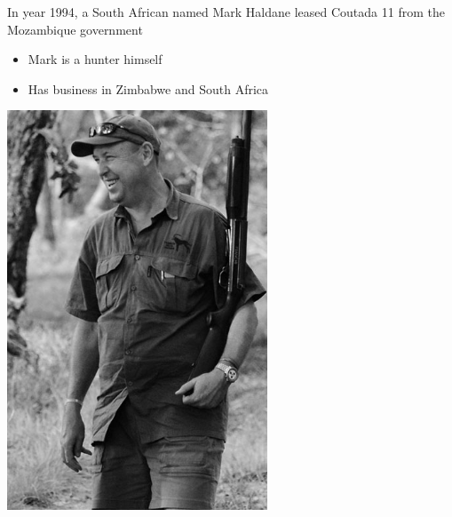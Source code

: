 \begin{frame}{}
\protect\hypertarget{section-29}{}

In year 1994, a South African named Mark Haldane leased Coutada 11 from
the Mozambique government

\begin{itemize}
\tightlist
\item
  Mark is a hunter himself
\item
  Has business in Zimbabwe and South Africa
\end{itemize}

\end{frame}

\begin{frame}{}
\protect\hypertarget{section-30}{}

\includegraphics[width=\textwidth,height=4.6875in]{figures/m4_haldane.jpg}

\end{frame}


